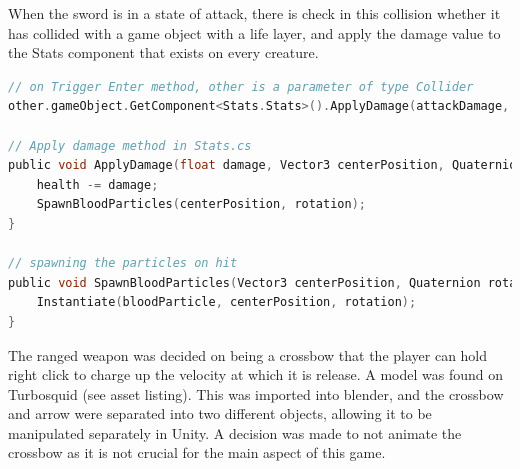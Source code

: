 \documentclass[11pt]{report}
\begin{document}
When the sword is in a state of attack, there is check in this collision whether it has collided with a game object with a life layer, and apply the damage value to the Stats component that exists on every creature.

\begin{lstlisting}[language=c]
// on Trigger Enter method, other is a parameter of type Collider
other.gameObject.GetComponent<Stats.Stats>().ApplyDamage(attackDamage, other.bounds.center, other.transform.rotation);

// Apply damage method in Stats.cs
public void ApplyDamage(float damage, Vector3 centerPosition, Quaternion rotation) {
    health -= damage;
    SpawnBloodParticles(centerPosition, rotation);
}

// spawning the particles on hit
public void SpawnBloodParticles(Vector3 centerPosition, Quaternion rotation) {
    Instantiate(bloodParticle, centerPosition, rotation);
}
\end{lstlisting}

The ranged weapon was decided on being a crossbow that the player can hold right click to charge up the velocity at which it is release. A model was found on Turbosquid (see asset listing). This was imported into blender, and the crossbow and arrow were separated into two different objects, allowing it to be manipulated separately in Unity. A decision was made to not animate the crossbow as it is not crucial for the main aspect of this game.
\end{document}
